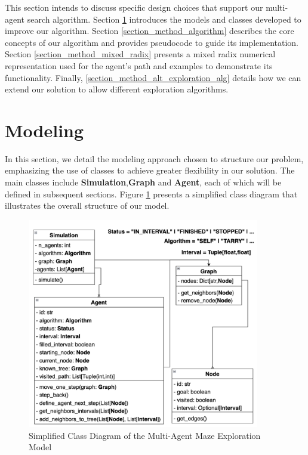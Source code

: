 This section intends to discuss specific design choices that support
our multi-agent search algorithm.
Section \ref{section_method_modeling} introduces the models and classes developed to improve our algorithm.
Section \ref{section_method_algorithm} describes the core concepts of our algorithm and provides pseudocode to guide its implementation.
Section \ref{section_method_mixed_radix} presents a mixed radix numerical representation used for the agent's path and examples to demonstrate its functionality.
Finally, \ref{section_method_alt_exploration_alg} details how we can extend our solution to allow different exploration algorithms.

\section{Modeling}
\label{section_method_modeling}

In this section, we detail the modeling approach chosen to structure our problem,
emphasizing the use of classes to achieve greater flexibility in our solution.
The main classes include \textbf{Simulation},\textbf{Graph} and \textbf{Agent}, each of which will be defined in subsequent sections.
Figure \ref{fig:class_diagram} presents a simplified class diagram that illustrates the overall structure of our model.

\begin{figure}[ht!]
    \centering
    \includegraphics[width=0.9\textwidth]{Cap2/simplified_class_diagram.png}
    \caption{Simplified Class Diagram of the Multi-Agent Maze Exploration Model}
    \label{fig:class_diagram}
\end{figure}

